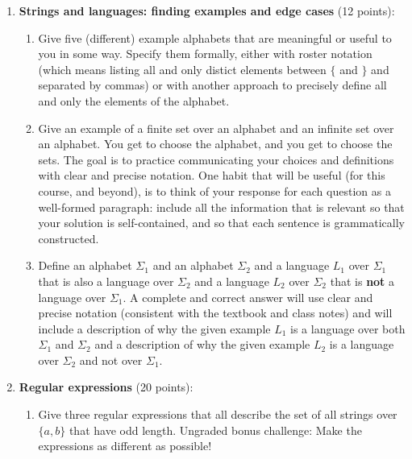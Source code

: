 \begin{enumerate}[wide, labelwidth=!, labelindent=0pt]
\item\textbf{Strings and languages: finding examples and edge cases} (12 points):
    \begin{enumerate}
    \item\gradeCompleteFirst  Give five (different) example alphabets that are meaningful or useful to you in some way. Specify them formally, either with 
    roster notation (which means listing all and only distict elements between $\{$ and $\}$ and separated by commas) or with another approach to precisely define all and only the elements of the alphabet.

    \item\gradeComplete Give an example of a finite set over an alphabet  and an infinite set over an alphabet. You get to choose the alphabet, and you get to choose the sets.  The goal is to practice communicating your choices and definitions with clear and precise notation. One habit that will be useful (for this course, and beyond), is to think of your response for each question as a well-formed paragraph: include all the information that is relevant so that your solution is self-contained, and so that each sentence is grammatically constructed.
    
    \item\gradeCorrectFirst Define an alphabet $\Sigma_1$ and an alphabet $\Sigma_2$ and a language $L_1$ over $\Sigma_1$ that is also a language over $\Sigma_2$ and a language $L_2$ over $\Sigma_2$ that is {\bf not} a language over $\Sigma_1$. 
    A complete and correct answer will use clear and precise notation
    (consistent with the textbook and class notes) and will include a description of why the given example $L_1$
    is a language over both $\Sigma_1$ and $\Sigma_2$ and a description 
    of why the given example $L_2$ is a language over $\Sigma_2$ and not over $\Sigma_1$.

    \end{enumerate}

\item\textbf{Regular expressions} (20 points):

    \begin{enumerate}
    \item\gradeComplete  Give three regular expressions that all describe the set of all strings over $\{a,b\}$ that have 
    odd length. Ungraded bonus challenge: Make the expressions as different as possible!


\end{enumerate}
\end{enumerate}
